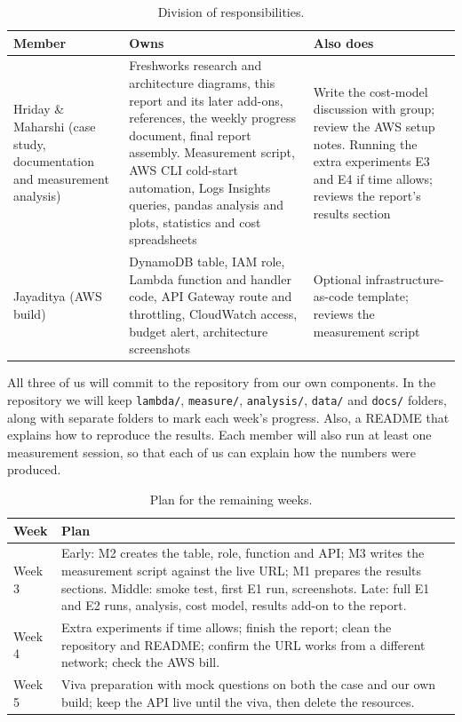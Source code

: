 \documentclass[10pt,a4paper]{article}
\newcommand{\code}[1]{\texttt{#1}}
\begin{document}
\begin{table}[H]
\centering\small
\caption{Division of responsibilities.}\label{tab:roles}
\begin{tabularx}{\textwidth}{@{}l Y Y@{}}
\toprule
Member & Owns & Also does \\
\midrule
Hriday \& Maharshi  \newline (case study, documentation and measurement analysis) & Freshworks research and architecture diagrams, this report and its later add-ons, references, the weekly progress document, final report assembly. Measurement script, AWS CLI cold-start automation, Logs Insights queries, pandas analysis and plots, statistics and cost spreadsheets & Write the cost-model discussion with group; review the AWS setup notes. Running the extra experiments E3 and E4 if time allows; reviews the report's results section \\
Jayaditya \newline (AWS build) & DynamoDB table, IAM role, Lambda function and handler code, API Gateway route and throttling, CloudWatch access, budget alert, architecture screenshots & Optional infrastructure-as-code template; reviews the measurement script \\
\bottomrule
\end{tabularx}
\end{table}

All three of us will commit to the repository from our own components. In the repository we will keep \code{lambda/}, \code{measure/}, \code{analysis/}, \code{data/} and \code{docs/} folders, along with separate folders to mark each week's progress. Also, a README that explains how to reproduce the results. Each member will also run at least one measurement session, so that each of us can explain how the numbers were produced.

\begin{table}[ht]
\centering\small
\caption{Plan for the remaining weeks.}\label{tab:sched}
\begin{tabularx}{\textwidth}{@{}l Y@{}}
\toprule
Week & Plan \\
\midrule
Week 3 & Early: M2 creates the table, role, function and API; M3 writes the measurement script against the live URL; M1 prepares the results sections. Middle: smoke test, first E1 run, screenshots. Late: full E1 and E2 runs, analysis, cost model, results add-on to the report. \\
Week 4 & Extra experiments if time allows; finish the report; clean the repository and README; confirm the URL works from a different network; check the AWS bill. \\
Week 5 & Viva preparation with mock questions on both the case and our own build; keep the API live until the viva, then delete the resources. \\
\bottomrule
\end{tabularx}
\end{table}
\end{document}
